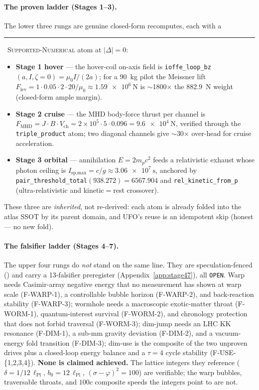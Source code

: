 \documentclass[11pt,a4paper]{article}
\newcommand{\tierdisc}[1]{\textcolor{#1}{\rule[0.05ex]{1.0ex}{1.0ex}}}
\newcommand{\tierdiscopen}{\textcolor{gray!60!black}{\scalebox{0.6}{$\bigcirc$}}}
\newcommand{\tierGreen}{\tierdisc{green!60!black}}
\newcommand{\tierWhite}{\tierdiscopen}
\begin{document}
\paragraph{The proven ladder (Stages 1--3).} The lower three rungs are
genuine closed-form recomputes, each with a \tierGreen\
\textsc{Supported-Numerical} atom at $|\Delta|=0$:
\begin{itemize}\itemsep0.2em
\item \textbf{Stage 1 hover} --- the hover-coil on-axis field is
  \texttt{ioffe\_loop\_bz}$(a,I,\zeta\!=\!0)=\mu_0 I/(2a)$; for a
  \SI{90}{\kilogram} pilot the Meissner lift
  $F_{\text{lev}}=1\!\cdot\!0.05\!\cdot\!2\!\cdot\!20/\mu_0
  \approx\SI{1.59e6}{\newton}$ is $\sim$1800$\times$ the
  \SI{882.9}{\newton} weight (closed-form ample margin).
\item \textbf{Stage 2 cruise} --- the MHD body-force thrust per channel
  is $F_{\text{MHD}}=J\!\cdot\!B\!\cdot\!V_{\text{ch}}
  =2\!\times\!10^5\!\cdot\!5\!\cdot\!0.096=\SI{9.6e4}{\newton}$,
  verified through the \texttt{triple\_product} atom; two diagonal
  channels give $\sim$30$\times$ over-head for cruise acceleration.
\item \textbf{Stage 3 orbital} --- annihilation $E=2m_pc^2$ feeds a
  relativistic exhaust whose photon ceiling is
  $I_{\text{sp,max}}=c/g\approx\SI{3.06e7}{\second}$, anchored by
  \texttt{pair\_threshold\_total}$(938.272)=6567.904$ and
  \texttt{rel\_kinetic\_from\_p} (ultra-relativistic and
  kinetic$=$rest crossover).
\end{itemize}
These three are \emph{inherited}, not re-derived: each atom is already
folded into the atlas SSOT by its parent domain, and UFO's reuse is an
idempotent skip (honest --- no new fold).

\paragraph{The falsifier ladder (Stages 4--7).} The upper four rungs do
\emph{not} stand on the same line. They are speculation-fenced
(\tierWhite) and carry a 13-falsifier preregister
(Appendix~\ref{app:stage47}), all \texttt{OPEN}. Warp needs Casimir-array
negative energy that no measurement has shown at warp scale (F-WARP-1),
a controllable bubble horizon (F-WARP-2), and back-reaction stability
(F-WARP-3); wormhole needs a macroscopic exotic-matter throat
(F-WORM-1), quantum-interest survival (F-WORM-2), and chronology
protection that does not forbid traversal (F-WORM-3); dim-jump needs an
LHC KK resonance (F-DIM-1), a sub-mm gravity deviation (F-DIM-2), and a
vacuum-energy fold transition (F-DIM-3); dim-use is the composite of the
two unproven drives plus a closed-loop energy balance and a
$\tau\!=\!4$ cycle stability (F-USE-\{1,2,3,4\}). \textbf{None is
claimed achieved.} The lattice integers they reference
($\delta=1/12\,\ell_{\text{Pl}}$, $b_0=12\,\ell_{\text{Pl}}$,
$(\sigma\!-\!\varphi)^2=100$) are verifiable; the warp bubbles,
traversable throats, and $100c$ composite speeds the integers point to
are not.
\end{document}
